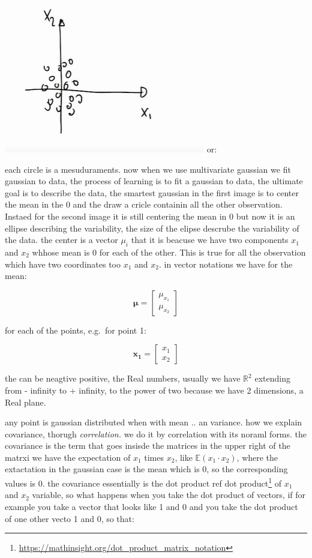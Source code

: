\documentclass[
  12pt,
  a4paper,
  oneside]{book}
\DeclareRobustCommand{\href}[2]{#2\footnote{\url{#1}}}
\theoremstyle{definition}
\theoremstyle{definition}
\theoremstyle{definition}
\theoremstyle{remark}
\begin{document}
\includegraphics{appendix_images/gp_base_1.jpg}
or:

each circle is a mesuduraments. now when we use multivariate gaussian we fit gaussian to data, the process of learning is to fit a gaussian to data, the ultimate goal is to describe the data, the smartest gaussian in the first image is to center the mean in the 0 and the draw a cricle containin all the other observation. Instaed for the second image it is still centering the mean in 0 but now it is an ellipse describing the variability, the size of the elipse descrube the variability of the data.
the center is a vector \(\mu_{i}\) that it is beacuse we have two components \(x_1\) and \(x_2\) whhose mean is 0 for each of the other. This is true for all the observation which have two coordinates too \(x_1\) and \(x_2\). in vector notations we have for the mean:

\[
\boldsymbol{\mu}=\left[\begin{array}{ll}
\mu_{x_1} \\
\mu_{x_2}
\end{array}\right]
\]

for each of the points, e.g.~for point 1:

\[
\mathbf{x_1}=\left[\begin{array}{ll}
x_1 \\
x_2
\end{array}\right]
\]

the can be neagtive positive, the Real numbers, usually we have \(\mathbb{R}^{2}\) extending from - infinity to + infinity, to the power of two because we have 2 dimensions, a Real plane.

any point is gaussian distributed when with mean .. an variance.
how we explain covariance, thorugh \emph{correlation.}
we do it by correlation with its noraml forms. the covariance is the term that goes insisde the matrices in the upper right of the matrxi we have the expectation of \(x_1\) times \(x_2\), like \(\mathbb{E}(x_1 \cdot x_2)\), where the extactation in the gaussian case is the mean which is 0, so the corresponding values is 0.
the covariance essentially is the dot product \href{https://mathinsight.org/dot_product_matrix_notation}{ref dot product} of \(x_1\) and \(x_2\) variable, so what happens when you take the dot product of vectors,
if for example you take a vector that looks like 1 and 0 and you take the dot product of one other vecto 1 and 0, so that:
\end{document}
